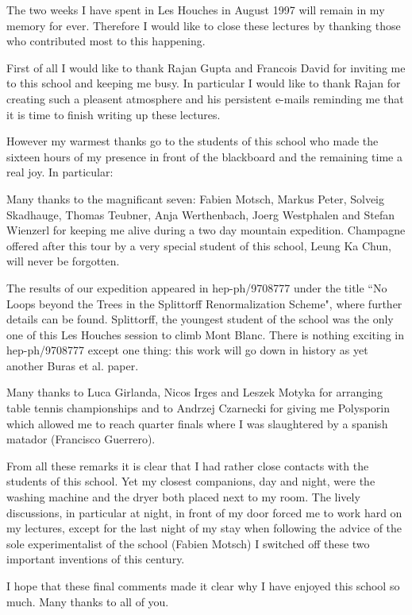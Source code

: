 The two weeks I have spent in Les Houches in August 1997 will remain in my
memory for ever. Therefore I would like to close these lectures by thanking
those who contributed most to this happening.

First of all I would like to thank Rajan Gupta and Francois David for
inviting me to this school and keeping me busy. In particular I would like to
thank Rajan for creating such a pleasent atmosphere and his persistent
e-mails reminding me that it is time to finish writing up these lectures.

However my warmest thanks go to the students of this school 
who made the sixteen hours of my presence in front of the blackboard
and the remaining time a real joy. In particular:
\bi
\item
 Many thanks to the magnificant seven: Fabien Motsch, Markus Peter, Solveig
Skadhauge, Thomas Teubner, Anja Werthenbach, Joerg Westphalen and Stefan
Wienzerl for keeping me alive during a two day mountain expedition.
Champagne offered after this tour by a very special
student of this school, Leung Ka Chun, will never be forgotten.
\item
 The results of our expedition appeared in hep-ph/9708777 under the title
``No Loops beyond the Trees in the Splittorff Renormalization Scheme", where
further details can be found. Splittorff, the youngest student of the school
was the only one of this Les Houches session to climb Mont Blanc. There is
nothing exciting in hep-ph/9708777 except one thing: 
this work will go down in history as yet another 
Buras et al. paper.
\item
 Many thanks to Luca Girlanda, Nicos Irges and Leszek Motyka 
for arranging table tennis
championships and to Andrzej Czarnecki for giving me Polysporin which allowed
me to reach quarter finals where I was slaughtered by a spanish
matador (Francisco Guerrero).
\item
 From all these remarks it is clear that I had rather close contacts with
the students of this school. 
Yet my closest companions, day and night, were
the washing machine and the dryer both placed next to my room.
The lively discussions, in particular at night, in front of my door
forced me to work hard on my lectures, except for the last night of my stay
when following the advice of the sole experimentalist
of the school (Fabien Motsch) I switched off these two important
inventions of this century.
\ei

I hope that these final comments made it clear why I have enjoyed this school
so much. Many thanks to all of you.    

